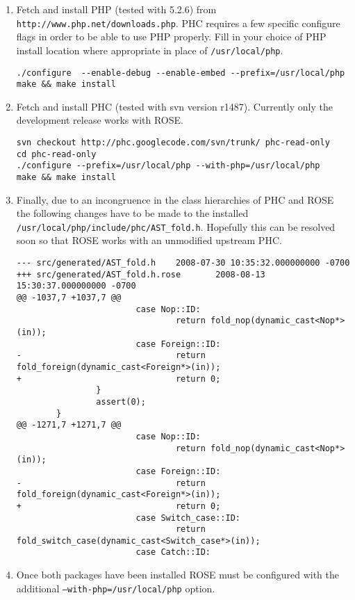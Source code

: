 \begin{enumerate}
\item
Fetch and install PHP (tested with 5.2.6) from
\texttt{http://www.php.net/downloads.php}.  PHC requires a few
specific configure flags in order to be able to use PHP properly.
Fill in your choice of PHP install location where appropriate in place
of \texttt{/usr/local/php}.
\begin{verbatim}
./configure  --enable-debug --enable-embed --prefix=/usr/local/php
make && make install
\end{verbatim}

\item
Fetch and install PHC (tested with svn version r1487).  Currently only
the development release works with ROSE.
\begin{verbatim}
svn checkout http://phc.googlecode.com/svn/trunk/ phc-read-only
cd phc-read-only
./configure --prefix=/usr/local/php --with-php=/usr/local/php
make && make install
\end{verbatim}

\item
Finally, due to an incongruence in the class hierarchies of PHC and
ROSE the following changes have to be made to the installed
\texttt{/usr/local/php/include/phc/AST\_fold.h}.  Hopefully this can be
resolved soon so that ROSE works with an unmodified upstream PHC.

\begin{verbatim}
--- src/generated/AST_fold.h    2008-07-30 10:35:32.000000000 -0700
+++ src/generated/AST_fold.h.rose       2008-08-13 15:30:37.000000000 -0700
@@ -1037,7 +1037,7 @@
                        case Nop::ID:
                                return fold_nop(dynamic_cast<Nop*>(in));
                        case Foreign::ID:
-                               return fold_foreign(dynamic_cast<Foreign*>(in));
+                               return 0;
                }
                assert(0);
        }
@@ -1271,7 +1271,7 @@
                        case Nop::ID:
                                return fold_nop(dynamic_cast<Nop*>(in));
                        case Foreign::ID:
-                               return fold_foreign(dynamic_cast<Foreign*>(in));
+                               return 0;
                        case Switch_case::ID:
                                return fold_switch_case(dynamic_cast<Switch_case*>(in));
                        case Catch::ID:
\end{verbatim}

\item
Once both packages have been installed ROSE must be configured with
the additional \texttt{--with-php=/usr/local/php} option.
\end{enumerate}
